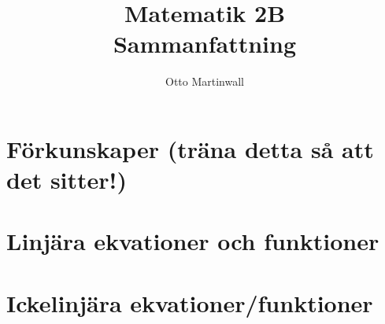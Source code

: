 
\usepackage[swedish]{babel}

\title{Matematik 2B \\ Sammanfattning}
\author{Otto Martinwall}


\maketitle
\tableofcontents
\newpage

\newtheorem{definition}{Definition}
\newtheorem{theorem}{Theorem}

\section{Förkunskaper (träna detta så att det sitter!)}


\section{Linjära ekvationer och funktioner}


\section{Ickelinjära ekvationer/funktioner}


